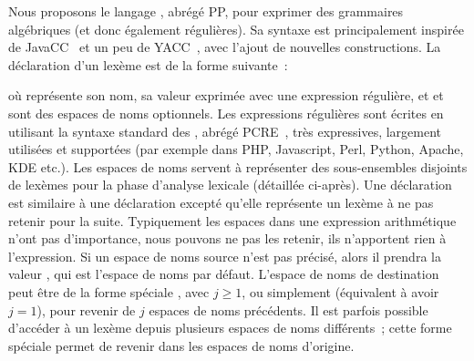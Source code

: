 Nous proposons le langage , abrégé PP, pour exprimer des
grammaires algébriques (et donc également régulières). Sa syntaxe est
principalement inspirée de JavaCC~ et un peu de
YACC~, avec l'ajout de nouvelles constructions. La déclaration
d'un lexème est de la forme suivante~:
%
\begin{pre}
\end{pre}
%
où  représente son nom,  sa valeur exprimée avec une
expression régulière, et  et  sont des espaces
de noms optionnels. Les expressions régulières sont écrites en utilisant la
syntaxe standard des , abrégé
PCRE~, très expressives, largement utilisées et supportées (par
exemple dans PHP, Javascript, Perl, Python, Apache, KDE etc.). Les espaces de
noms servent à représenter des sous-ensembles disjoints de lexèmes pour la phase
d'analyse lexicale (détaillée ci-après). Une déclaration  est
similaire à une déclaration  excepté qu'elle représente un lexème
à ne pas retenir pour la suite. Typiquement les espaces dans une expression
arithmétique n'ont pas d'importance, nous pouvons ne pas les retenir, ils
n'apportent rien à l'expression. Si un espace de noms source n'est pas précisé,
alors il prendra la valeur , qui est l'espace de noms par défaut.
L'espace de noms de destination peut être de la forme spéciale
, avec $j \geq 1$, ou simplement 
(équivalent à avoir $j = 1$), pour revenir de $j$ espaces de noms précédents. Il
est parfois possible d'accéder à un lexème depuis plusieurs espaces de noms
différents~; cette forme spéciale permet de revenir dans les espaces de noms
d'origine. \\

